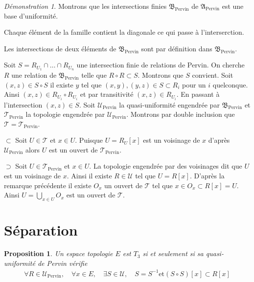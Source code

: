\documentclass[a4paper, 11pt, french]{book}
\newenvironment{itemise}{\itemize}{\enditemize}
\theoremstyle{plain} %
\newtheorem{proposition}{Proposition}
\theoremstyle{definition} %
\theoremstyle{remark} %
\newtheorem*{demonstration}{Démonstration}
\newcommand{\1}{\mathds{1}}
\newcommand{\inv}[1]{#1^{-1}}
\newcommand{\et}{\mathrel{\mathrm{et}}}
\renewcommand{\frak}[1]{\mathfrak{#1}}
\newcommand{\scr}[1]{\mathscr{#1}}
\renewcommand{\rm}[1]{\mathrm{#1}}
\begin{document}
\begin{demonstration}
	Montrons que les intersections finies $\frak{B}_\rm{Pervin}$ de $\frak{A}_\rm{Pervin}$ est une base d'uniformité.
	\begin{itemise}
		\item Chaque élément de la famille contient la diagonale ce qui passe à l'interserction.
		\item Les intersections de deux éléments de $\frak{B}_\rm{Pervin}$ sont par définition dans $\frak{B}_\rm{Pervin}$.
		\item Soit $S=R_{U_1}\cap\dots\cap R_{U_n}$ une intersection finie de relations de Pervin.
		On cherche $R$ une relation de $\frak{B}_\rm{Pervin}$ telle que $R\circ R\subset S$.
		Montrons que $S$ convient.
		Soit $(x, z)\in S\circ S$ il existe $y$ tel que $(x, y), (y, z)\in S\subset R_i$ pour un $i$ quelconque.
		Ainsi $(x, z)\in R_{U_i}\circ R_{U_i}$ et par transitivité $(x, z)\in R_{U_i}$.
		En passant à l'intersection $(x, z)\in S$.
	\end{itemise}
	Soit $\scr{U}_\rm{Pervin}$ la quasi-uniformité engendrée par $\frak{B}_\rm{Pervin}$ et $\scr{T}_\rm{Pervin}$ la topologie engendrée par $\scr{U}_\rm{Pervin}$.
	Montrons par double inclusion que $\scr{T}=\scr{T}_\rm{Pervin}$.
	\begin{itemise}
		\item[$\subset$] Soit $U\in\scr{T}$ et $x\in U$.
		Puisque $U=R_U[x]$ est un voisinage de $x$ d'après $\scr{U}_\rm{Pervin}$ alors $U$ est un ouvert de $\scr{T}_\rm{Pervin}$.
		\item[$\supset$] Soit $U\in\scr{T}_\rm{Pervin}$ et $x\in U$.
		La topologie engendrée par des voisinages dit que $U$ est un voisinage de $x$.
		Ainsi il existe $R\in\scr{U}$ tel que $U=R[x]$.
		D'après la remarque précédente il existe $O_x$ un ouvert de $\scr{T}$ tel que $x\in O_x\subset R[x]=U$.
		Ainsi $U=\bigcup_{x\in U}O_x$ est un ouvert de $\scr{T}$.
	\end{itemise}
\end{demonstration}

\section{Séparation}

\begin{proposition}
	Un espace topologie $E$ est $T_3$ si et seulement si sa quasi-uniformité de Pervin vérifie
	\begin{align*}
		\forall R\in\scr{U}_\rm{Pervin},\quad \forall x\in E,\quad \exists S\in\scr{U},\quad S=\inv{S}\et (S\circ S)[x]\subset R[x]
	\end{align*}
\end{proposition}
\end{document}
